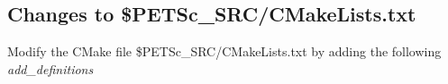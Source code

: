 \documentclass[10pt,a4paper]{article}
\newcommand{\bs}{\ensuremath{\backslash}}
\begin{document}
%
%


\subsection{Changes to \$PETSc\_SRC/CMakeLists.txt}\label{sec:petsc:cmake}
Modify the CMake file \$PETSc\_SRC/CMakeLists.txt by adding the following
\textit{add\_definitions}
\end{document}
